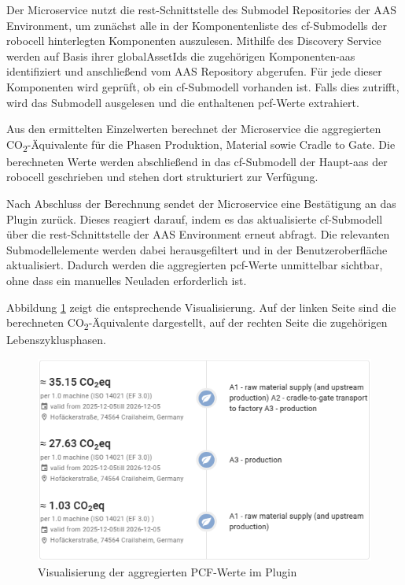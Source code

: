 
Der Microservice nutzt die \acs{rest}-Schnittstelle des Submodel Repositories der AAS Environment, um zunächst alle in der Komponentenliste des \acs{cf}-Submodells der robocell hinterlegten Komponenten auszulesen. 
Mithilfe des Discovery Service werden auf Basis ihrer globalAssetIds die zugehörigen Komponenten-\acs{aas} identifiziert und anschließend vom AAS Repository abgerufen.
Für jede dieser Komponenten wird geprüft, ob ein \acs{cf}-Submodell vorhanden ist. 
Falls dies zutrifft, wird das Submodell ausgelesen und die enthaltenen \acs{pcf}-Werte extrahiert.

Aus den ermittelten Einzelwerten berechnet der Microservice die aggregierten CO\textsubscript{2}-Äquivalente für die Phasen Produktion, Material sowie Cradle to Gate. 
Die berechneten Werte werden abschließend in das \acs{cf}-Submodell der Haupt-\acs{aas} der robocell geschrieben und stehen dort strukturiert zur Verfügung.

Nach Abschluss der Berechnung sendet der Microservice eine Bestätigung an das Plugin zurück. 
Dieses reagiert darauf, indem es das aktualisierte \acs{cf}-Submodell über die \acs{rest}-Schnittstelle der AAS Environment erneut abfragt. 
Die relevanten Submodellelemente werden dabei herausgefiltert und in der Benutzeroberfläche aktualisiert. 
Dadurch werden die aggregierten \acs{pcf}-Werte unmittelbar sichtbar, ohne dass ein manuelles Neuladen erforderlich ist.

Abbildung \ref{fig:PluginAggregation} zeigt die entsprechende Visualisierung. 
Auf der linken Seite sind die berechneten CO\textsubscript{2}-Äquivalente dargestellt, auf der rechten Seite die zugehörigen Lebenszyklusphasen.

\begin{figure}[htbp]
    \centering
        \includegraphics{Bilder/Ergebnisse/DPP/PluginAggregation.png}
    \caption{Visualisierung der aggregierten PCF-Werte im Plugin}
    \label{fig:PluginAggregation}
\end{figure}

